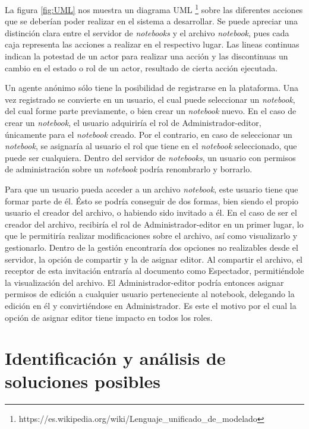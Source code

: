 \documentclass[11pt,spanish,listoffigures]{tfgetsinf}
\begin{document}
La figura \ref{fig:UML} nos muestra un diagrama UML \footnote{https://es.wikipedia.org/wiki/Lenguaje\_unificado\_de\_modelado} sobre las diferentes acciones que se deberían poder realizar en el sistema a desarrollar. Se puede apreciar una distinción clara entre el servidor de \textit{notebooks} y el archivo \textit{notebook}, pues cada caja representa las acciones a realizar en el respectivo lugar. Las lineas continuas indican la potestad de un actor para realizar una acción y las discontinuas un cambio en el estado o rol de un actor, resultado de cierta acción ejecutada.

Un agente anónimo sólo tiene la posibilidad de registrarse en la plataforma. Una vez registrado se convierte en un usuario, el cual puede seleccionar un \textit{notebook}, del cual forme parte previamente, o bien crear un \textit{notebook} nuevo. En el caso de crear un \textit{notebook}, el usuario adquiriría el rol de Administrador-editor, únicamente para el \textit{notebook} creado. Por el contrario, en caso de seleccionar un \textit{notebook}, se asignaría al usuario el rol que tiene en el \textit{notebook} seleccionado, que puede ser cualquiera. Dentro del servidor de \textit{notebooks}, un usuario con permisos de administración sobre un \textit{notebook} podría renombrarlo y borrarlo.

Para que un usuario pueda acceder a un archivo \textit{notebook}, este usuario tiene que formar parte de él. Ésto se podría conseguir de dos formas, bien siendo el propio usuario el creador del archivo, o habiendo sido invitado a él. En el caso de ser el creador del archivo, recibiría el rol de Administrador-editor en un primer lugar, lo que le permitiría realizar modificaciones sobre el archivo, así como visualizarlo y gestionarlo. Dentro de la gestión encontraría dos opciones no realizables desde el servidor, la opción de compartir y la de asignar editor. Al compartir el archivo, el receptor de esta invitación entraría al documento como Espectador, permitiéndole la visualización del archivo. El Administrador-editor podría entonces asignar permisos de edición a cualquier usuario perteneciente al notebook, delegando la edición en él y convirtiéndose en Administrador. Es este el motivo por el cual la opción de asignar editor tiene impacto en todos los roles.


\section{Identificación y análisis de soluciones posibles}
\label{sec:ident-soluciones}
\end{document}
